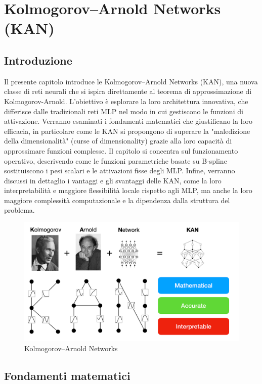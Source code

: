 \documentclass[a4paper,12pt]{report}
\begin{document}
	\chapter{Kolmogorov–Arnold Networks (KAN)}
	
	\section{Introduzione}
	Il presente capitolo introduce le Kolmogorov–Arnold Networks (KAN), una nuova classe di reti neurali che si ispira direttamente al teorema di approssimazione di Kolmogorov-Arnold. L'obiettivo è esplorare la loro architettura innovativa, che differisce dalle tradizionali reti MLP nel modo in cui gestiscono le funzioni di attivazione. Verranno esaminati i fondamenti matematici che giustificano la loro efficacia, in particolare come le KAN si propongono di superare la "maledizione della dimensionalità" (curse of dimensionality) grazie alla loro capacità di approssimare funzioni complesse. Il capitolo si concentra sul funzionamento operativo, descrivendo come le funzioni parametriche basate su B-spline sostituiscono i pesi scalari e le attivazioni fisse degli MLP. Infine, verranno discussi in dettaglio i vantaggi e gli svantaggi delle KAN, come la loro interpretabilità e maggiore flessibilità locale rispetto agli MLP, ma anche la loro maggiore complessità computazionale e la dipendenza dalla struttura del problema.
	
	\begin{figure}[H]
		\centering
		\includegraphics[width=1.0\textwidth]{img/kan_1st_image.png}
		\caption{Kolmogorov–Arnold Networks}
	\end{figure}
	
	\section{Fondamenti matematici}
	
\end{document}
